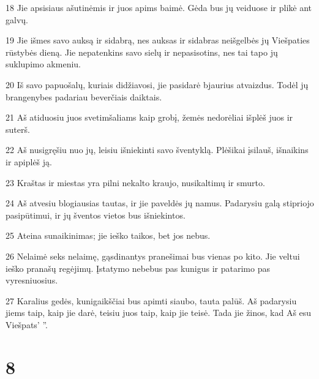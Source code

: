 \par 18 Jie apsisiaus ašutinėmis ir juos apims baimė. Gėda bus jų veiduose ir plikė ant galvų. 
\par 19 Jie išmes savo auksą ir sidabrą, nes auksas ir sidabras neišgelbės jų Viešpaties rūstybės dieną. Jie nepatenkins savo sielų ir nepasisotins, nes tai tapo jų suklupimo akmeniu. 
\par 20 Iš savo papuošalų, kuriais didžiavosi, jie pasidarė bjaurius atvaizdus. Todėl jų brangenybes padariau beverčiais daiktais. 
\par 21 Aš atiduosiu juos svetimšaliams kaip grobį, žemės nedorėliai išplėš juos ir suterš. 
\par 22 Aš nusigręšiu nuo jų, leisiu išniekinti savo šventyklą. Plėšikai įsilauš, išnaikins ir apiplėš ją. 
\par 23 Kraštas ir miestas yra pilni nekalto kraujo, nusikaltimų ir smurto. 
\par 24 Aš atvesiu blogiausias tautas, ir jie paveldės jų namus. Padarysiu galą stipriojo pasipūtimui, ir jų šventos vietos bus išniekintos. 
\par 25 Ateina sunaikinimas; jie ieško taikos, bet jos nebus. 
\par 26 Nelaimė seks nelaimę, gąsdinantys pranešimai bus vienas po kito. Jie veltui ieško pranašų regėjimų. Įstatymo nebebus pas kunigus ir patarimo pas vyresniuosius. 
\par 27 Karalius gedės, kunigaikščiai bus apimti siaubo, tauta palūš. Aš padarysiu jiems taip, kaip jie darė, teisiu juos taip, kaip jie teisė. Tada jie žinos, kad Aš esu Viešpats’ ”.



\chapter{8}


